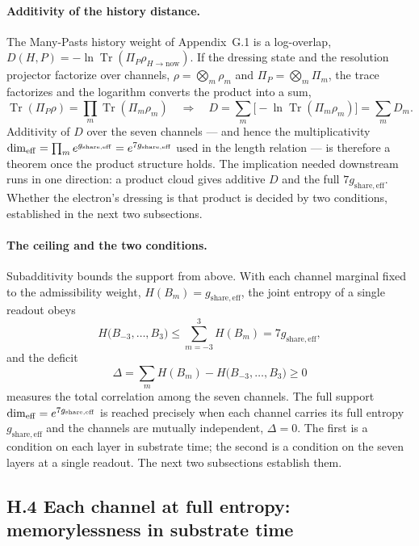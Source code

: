 \documentclass[11pt]{article}
\begin{document}
\paragraph{Additivity of the history distance.}
The Many-Pasts history weight of Appendix~G.1 is a log-overlap, $D(H,P)=-\ln\operatorname{Tr}(\Pi_P\rho_{H\to\mathrm{now}})$. If the dressing state and the resolution projector factorize over channels, $\rho=\bigotimes_m\rho_m$ and $\Pi_P=\bigotimes_m\Pi_m$, the trace factorizes and the logarithm converts the product into a sum,
\[
\operatorname{Tr}(\Pi_P\rho)=\prod_m\operatorname{Tr}(\Pi_m\rho_m)
\quad\Longrightarrow\quad
D=\sum_m\bigl[-\ln\operatorname{Tr}(\Pi_m\rho_m)\bigr]=\sum_m D_m .
\]
Additivity of $D$ over the seven channels --- and hence the multiplicativity $\dim_{\rm eff}=\prod_m e^{g_{\mathrm{share,eff}}}=e^{7g_{\mathrm{share,eff}}}$ used in the length relation --- is therefore a theorem once the product structure holds. The implication needed downstream runs in one direction: a product cloud gives additive $D$ and the full $7g_{\mathrm{share,eff}}$. Whether the electron's dressing is that product is decided by two conditions, established in the next two subsections.

\paragraph{The ceiling and the two conditions.}
Subadditivity bounds the support from above. With each channel marginal fixed to the admissibility weight, $H(B_m)=g_{\mathrm{share,eff}}$, the joint entropy of a single readout obeys
\[
H\bigl(B_{-3},\ldots,B_3\bigr)\le\sum_{m=-3}^{3}H(B_m)=7g_{\mathrm{share,eff}},
\]
and the deficit
\[
\Delta=\sum_{m}H(B_m)-H\bigl(B_{-3},\ldots,B_3\bigr)\ge 0
\]
measures the total correlation among the seven channels. The full support $\dim_{\rm eff}=e^{7g_{\mathrm{share,eff}}}$ is reached precisely when each channel carries its full entropy $g_{\mathrm{share,eff}}$ and the channels are mutually independent, $\Delta=0$. The first is a condition on each layer in substrate time; the second is a condition on the seven layers at a single readout. The next two subsections establish them.

\subsection*{H.4 Each channel at full entropy: memorylessness in substrate time}
\end{document}
